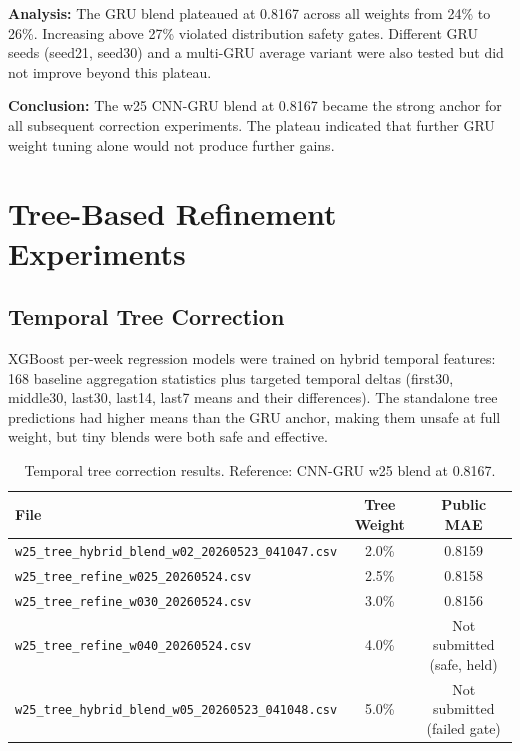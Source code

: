 \documentclass[12pt, a4paper]{article}
\begin{document}
\textbf{Analysis:} The GRU blend plateaued at 0.8167 across all weights from 24\% to 26\%. Increasing above 27\% violated distribution safety gates. Different GRU seeds (seed21, seed30) and a multi-GRU average variant were also tested but did not improve beyond this plateau.

\textbf{Conclusion:} The w25 CNN-GRU blend at 0.8167 became the strong anchor for all subsequent correction experiments. The plateau indicated that further GRU weight tuning alone would not produce further gains.

\section{Tree-Based Refinement Experiments}

\subsection{Temporal Tree Correction}
XGBoost per-week regression models were trained on hybrid temporal features: 168 baseline aggregation statistics plus targeted temporal deltas (first30, middle30, last30, last14, last7 means and their differences). The standalone tree predictions had higher means than the GRU anchor, making them unsafe at full weight, but tiny blends were both safe and effective.

\begin{table}[H]
\centering
\caption{Temporal tree correction results. Reference: CNN-GRU w25 blend at 0.8167.}
\label{tab:tree}
\begin{tabular}{@{}lcc@{}}
\toprule
\textbf{File} & \textbf{Tree Weight} & \textbf{Public MAE} \\
\midrule
\texttt{w25\_tree\_hybrid\_blend\_w02\_20260523\_041047.csv} & 2.0\% & 0.8159 \\
\texttt{w25\_tree\_refine\_w025\_20260524.csv}                & 2.5\% & 0.8158 \\
\texttt{w25\_tree\_refine\_w030\_20260524.csv}                & 3.0\% & 0.8156 \\
\texttt{w25\_tree\_refine\_w040\_20260524.csv}                & 4.0\% & Not submitted (safe, held) \\
\texttt{w25\_tree\_hybrid\_blend\_w05\_20260523\_041048.csv}   & 5.0\% & Not submitted (failed gate) \\
\bottomrule
\end{tabular}
\end{table}
\end{document}
